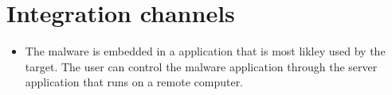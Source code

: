 \section{Integration channels}
	\begin{itemize}
		\item The malware is embedded in a application that is most likley used by the target. The user can control the malware application through the server application that runs on a remote computer.
		
		
	\end{itemize}